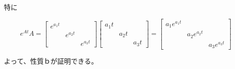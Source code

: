 \documentclass[xelatex,ja=standard,jafont=noto]{bxjsarticle}
\begin{document}
	特に
	
	\begin{equation}
	    e^{At}A={
\left[ \begin{array}{ccc}
e^{a_{1}t}&&\\
&e^{a_{2}t}&\\
&&e^{a_{3}t}
\end{array}
\right ]}{
\left[ \begin{array}{ccc}
a_{1}t&&\\
&a_{2}t&\\
&&a_{3}t
\end{array}
\right ]}={
\left[ \begin{array}{ccc}
a_{1}e^{a_{1}t}&&\\
&a_{2}e^{a_{2}t}&\\
&&a_{3}e^{a_{3}t}
\end{array}
\right ]}
	\end{equation}
	
	よって、性質ｂが証明できる。
	
	
	




	
	
\end{document}
